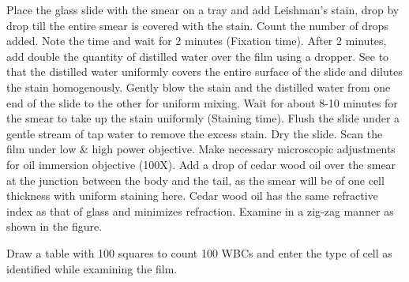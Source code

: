 \documentclass[a4paper,12pt]{book}
\begin{document}
					Place the glass slide with the smear on a tray and add Leishman’s stain, drop by drop till the entire smear is covered with the stain. Count the number of drops added. Note the time and wait for 2 minutes (Fixation time). After 2 minutes, add double the quantity of distilled water over the film using a dropper. See to that the distilled water uniformly covers the entire surface of the slide and dilutes the stain homogenously. Gently blow the stain and the distilled water from one end of the slide to the other for uniform mixing. Wait for about 8-10 minutes for the smear to take up the stain uniformly (Staining time).
					Flush the slide under a gentle stream of tap water to remove the excess stain. Dry the slide. Scan the film under low \& high power objective. Make necessary microscopic adjustments for oil immersion objective (100X). Add a drop of cedar wood oil over the smear at the junction between the body and the tail, as the smear will be of one cell thickness with uniform staining here. Cedar wood oil has the same refractive index as that of glass and minimizes refraction. Examine in a zig-zag manner as shown in the figure.

					Draw a table with 100 squares to count 100 WBCs and enter the type of cell as identified while examining the film.
\end{document}
